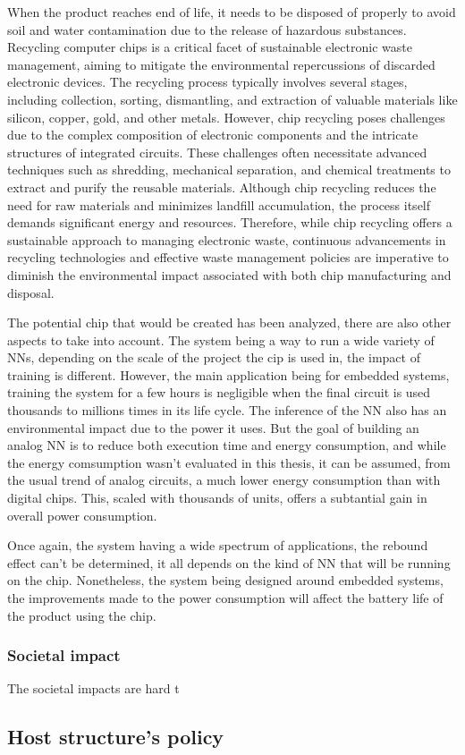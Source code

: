 When the product reaches end of life, it needs to be disposed of properly to avoid soil and water contamination due to the release of hazardous substances. Recycling computer chips is a critical facet of sustainable electronic waste management, aiming to mitigate the environmental repercussions of discarded electronic devices. The recycling process typically involves several stages, including collection, sorting, dismantling, and extraction of valuable materials like silicon, copper, gold, and other metals. However, chip recycling poses challenges due to the complex composition of electronic components and the intricate structures of integrated circuits. These challenges often necessitate advanced techniques such as shredding, mechanical separation, and chemical treatments to extract and purify the reusable materials. Although chip recycling reduces the need for raw materials and minimizes landfill accumulation, the process itself demands significant energy and resources. Therefore, while chip recycling offers a sustainable approach to managing electronic waste, continuous advancements in recycling technologies and effective waste management policies are imperative to diminish the environmental impact associated with both chip manufacturing and disposal.

The potential chip that would be created has been analyzed, there are also other aspects to take into account. The system being a way to run a wide variety of \acp{NN}, depending on the scale of the project the cip is used in, the impact of training is different. However, the main application being for embedded systems, training the system for a few hours is negligible when the final circuit is used thousands to millions times in its life cycle.
The inference of the \ac{NN} also has an environmental impact due to the power it uses. But the goal of building an analog \ac{NN} is to reduce both execution time and energy consumption, and while the energy comsumption wasn't evaluated in this thesis, it can be assumed, from the usual trend of analog circuits, a much lower energy consumption than with digital chips. This, scaled with thousands of units, offers a subtantial gain in overall power consumption.

Once again, the system having a wide spectrum of applications, the rebound effect can't be determined, it all depends on the kind of \ac{NN} that will be running on the chip. Nonetheless, the system being designed around embedded systems, the improvements made to the power consumption will affect the battery life of the product using the chip.

\subsubsection{Societal impact}

The societal impacts are hard t

\subsection{Host structure's policy}
